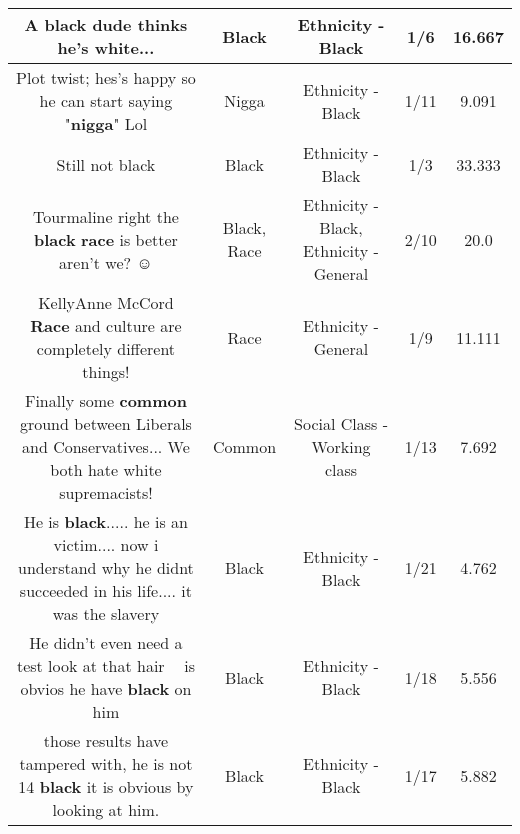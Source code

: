 \documentclass[11pt]{article}
\newlength\mylength
\begin{document}
\begin{center}
\begin{longtable}{|C{.65\mylength}|C{.30\mylength}|C{.12\mylength}|C{.12\mylength}|C{.12\mylength}|}
  \small A \textbf{black} dude thinks he's white...\normalsize   & Black & Ethnicity - Black & 1/6 & 16.667 \\  \hline
  \small Plot twist; hes's happy so he can start saying "\textbf{nigga}" Lol\normalsize   & Nigga & Ethnicity - Black & 1/11 & 9.091 \\  \hline
  \small Still not black\normalsize   & Black & Ethnicity - Black & 1/3 & 33.333 \\  \hline
  \small Tourmaline right the \textbf{black} \textbf{race} is better aren't we? ☺️\normalsize   & Black, Race & Ethnicity - Black, Ethnicity - General & 2/10 & 20.0 \\  \hline
  \small KellyAnne McCord    \textbf{Race} and culture are completely different things!\normalsize   & Race & Ethnicity - General & 1/9 & 11.111 \\  \hline
  \small Finally some \textbf{common} ground between Liberals and Conservatives... We both hate white supremacists!\normalsize   & Common & Social Class - Working class & 1/13 & 7.692 \\  \hline
  \small He is \textbf{black}..... he is an victim.... now i understand why he didnt succeeded in his life.... it was the slavery\normalsize   & Black & Ethnicity - Black & 1/21 & 4.762 \\  \hline
  \small He  didn't even need a test look at that hair 🤦‍♀️ is obvios he have \textbf{black} on him\normalsize   & Black & Ethnicity - Black & 1/18 & 5.556 \\  \hline
  \small those results have tampered with, he is not 14 \textbf{black} it is obvious by looking at him.\normalsize   & Black & Ethnicity - Black & 1/17 & 5.882 \\  \hline

\end{longtable}
\end{center}
\end{document}
